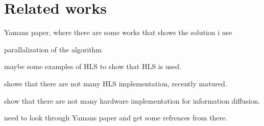 \chapter{Related works} \label{relatedWork}

\begin{list_type}  
\item Yamans paper, where there are some works that shows the solution i use
\item parallalization of the algorithm
\item maybe some examples of HLS to show that HLS is used.
\item showe that there are not many HLS implementation, recently matured. 
\item show that there are not many hardware implementation for information diffusion.
\item need to look through Yamans paper and get some refrences from there.
\end{list_type}